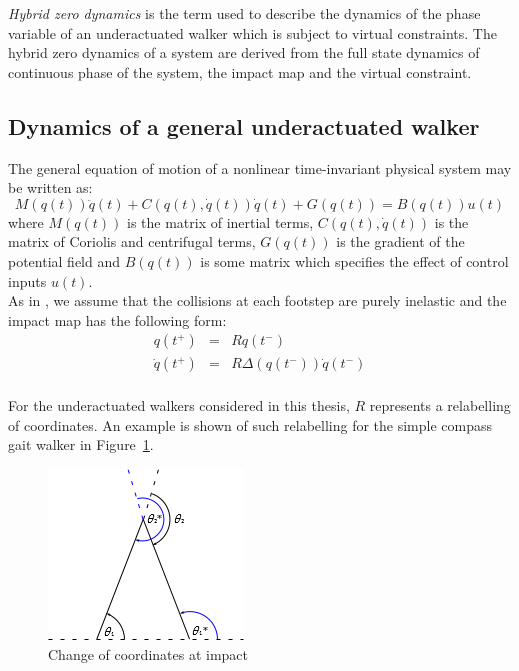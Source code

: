 \textit{Hybrid zero dynamics} is the term used to describe the dynamics of the phase variable of an underactuated walker which is subject to virtual constraints. The hybrid zero dynamics of a system are derived from the full state dynamics of continuous phase of the system, the impact map and the virtual constraint.

\subsection{Dynamics of a general underactuated walker}
The general equation of motion of a nonlinear time-invariant physical system may be written as:
\begin{equation}\label{eqn:dynamics}
	M\left(q(t)\right)\ddot{q}(t) + C\left(q(t),\dot{q}(t)\right)\dot{q}(t)
	 + G\left(q(t)\right) = B\left(q(t)\right)u(t)
\end{equation}
where $M\left(q(t)\right)$ is the matrix of inertial terms, $C\left(q(t),\dot{q}(t)\right)$ is the matrix of Coriolis and centrifugal terms, $G\left(q(t)\right)$ is the gradient of the potential field and $B\left(q(t)\right)$ is some matrix which specifies the effect of control inputs $u(t)$. \\

As in \cite{hurmuzlu1994rigid}, we assume that the collisions at each footstep are purely inelastic and the impact map has the following form:
\begin{eqnarray}
	q\left(t^+\right) &=& Rq\left(t^-\right) \\
	\dot{q}\left(t^+\right) &=& R\Delta\left(q\left(t^-\right)\right)\dot{q}\left(t^-\right)
\end{eqnarray} ~\\

For the underactuated walkers considered in this thesis, $R$ represents a relabelling of coordinates. An example is shown of such relabelling for the simple compass gait walker in Figure~\ref{fig:relabelimpact}.

\begin{figure}[htp]
	\centering
	\includegraphics[scale=1]{3TechBackground/impact.png}
	\caption{Change of coordinates at impact}
	\label{fig:relabelimpact}
\end{figure}

